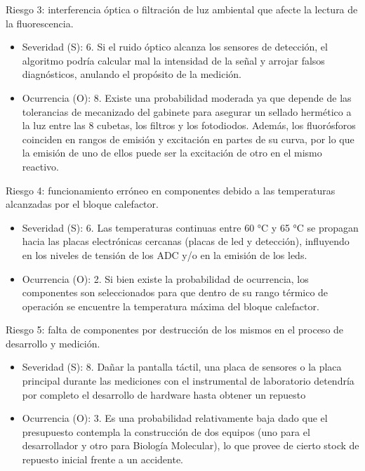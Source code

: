 \documentclass[
11pt, %
]{charter}
\begin{document}
Riesgo 3: interferencia óptica o filtración de luz ambiental que afecte la lectura de la fluorescencia.

\begin{itemize}
\item Severidad (S): 6. Si el ruido óptico alcanza los sensores de detección, el algoritmo podría calcular mal la intensidad de la señal y arrojar falsos diagnósticos, anulando el propósito de la medición. 

\item Ocurrencia (O): 8. Existe una probabilidad moderada ya que depende de las tolerancias de mecanizado del gabinete para asegurar un sellado hermético a la luz entre las 8 cubetas, los filtros y los fotodiodos. Además, los fluorósforos coinciden en rangos de emisión y excitación en partes de su curva, por lo que la emisión de uno de ellos puede ser la excitación de otro en el mismo reactivo.
\end{itemize}

Riesgo 4: funcionamiento erróneo en componentes debido a las temperaturas alcanzadas por el bloque calefactor.

\begin{itemize}
\item Severidad (S): 6. Las temperaturas continuas entre 60 °C y 65 °C se propagan hacia las placas electrónicas cercanas (placas de led y detección), influyendo en los niveles de tensión de los ADC y/o en la emisión de los leds.

\item Ocurrencia (O): 2. Si bien existe la probabilidad de ocurrencia, los componentes son seleccionados para que dentro de su rango térmico de operación se encuentre la temperatura máxima del bloque calefactor.
\end{itemize}

Riesgo 5: falta de componentes por destrucción de los mismos en el proceso de desarrollo y medición.

\begin{itemize}
\item Severidad (S): 8. Dañar la pantalla táctil, una placa de sensores o la placa principal durante las mediciones con el instrumental de laboratorio detendría por completo el desarrollo de hardware hasta obtener un repuesto 

\item Ocurrencia (O): 3. Es una probabilidad relativamente baja dado que el presupuesto contempla la construcción de dos equipos (uno para el desarrollador y otro para Biología Molecular), lo que provee de cierto stock de repuesto inicial frente a un accidente.
\end{itemize}
\end{document}
